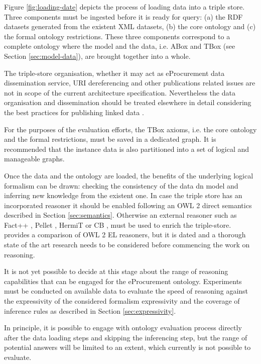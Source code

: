 	Figure \ref{fig:loading-date} depicts the process of loading data into a triple store. Three components must be ingested before it is ready for query: (a) the RDF datasets generated from the existent XML datasets, (b) the core ontology and (c) the formal ontology restrictions. These three components correspond to a complete ontology where the model and the data, i.e. ABox and TBox (see Section \ref{sec:model-data}), are brought together into a whole.
	
	The triple-store organisation, whether it may act as eProcurement data dissemination service, URI dereferencing and other publications related issues are not in scope of the current architecture specification. Nevertheless the data organisation and dissemination should be treated elsewhere in detail considering the best practices for publishing linked data \cite{bizer2009emerging}.
	
	For the purposes of the evaluation efforts, the TBox axioms, i.e. the core ontology and the formal restrictions, must be saved in a dedicated graph.  It is recommended that the instance data is also partitioned into a set of logical and manageable graphs.  

	Once the data and the ontology are loaded, the benefits of the underlying logical formalism can be drawn: checking the consistency of the data dn model and inferring new knowledge from the existent one. In case the triple store has an incorporated reasoner it should be enabled following an OWL 2 direct semantics described in Section \ref{sec:semantics}. Otherwise an external reasoner such as Fact++ \cite{tsarkov2006fact++}, Pellet \cite{sirin2007pellet}, HermiT \cite{shearer2008hermit} or CB \cite{kazakov2009consequence}, must be used to enrich the triple-store. \citet{dentler2011comparison} provides a comparison of OWL 2 EL reasoners, but it is dated and a thorough state of the art research needs to be considered before commencing the work on reasoning. 
	
	It is not yet possible to decide at this stage about the range of reasoning capabilities that can be engaged for the eProcurement ontology. Experiments must be conducted on available data to evaluate the speed of reasoning against the expressivity of the considered formalism expressivity and the coverage of inference rules as described in Section \ref{sec:expressivity}.
	
	In principle, it is possible to engage with ontology evaluation process directly after the data loading steps and skipping the inferencing step, but the range of potential answers will be limited to an extent, which currently is not possible to evaluate.
		
